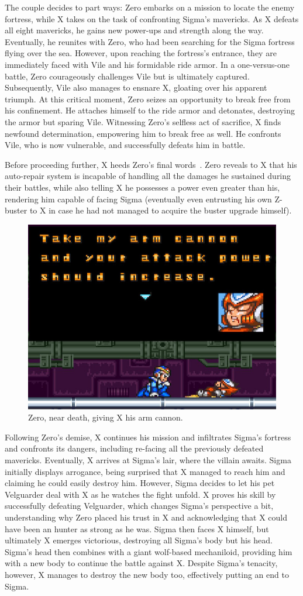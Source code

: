 The couple decides to part ways: Zero embarks on a mission to locate the enemy fortress, while X takes on the task of confronting Sigma's mavericks. As X defeats all eight mavericks, he gains new power-ups and strength along the way. Eventually, he reunites with Zero, who had been searching for the Sigma fortress flying over the sea. However, upon reaching the fortress's entrance, they are immediately faced with Vile and his formidable ride armor. In a one-versus-one battle, Zero courageously challenges Vile but is ultimately captured. Subsequently, Vile also manages to ensnare X, gloating over his apparent triumph. At this critical moment, Zero seizes an opportunity to break free from his confinement. He attaches himself to the ride armor and detonates, destroying the armor but sparing Vile. Witnessing Zero's selfless act of sacrifice, X finds newfound determination, empowering him to break free as well. He confronts Vile, who is now vulnerable, and successfully defeats him in battle.

Before proceeding further, X heeds Zero's final words~\cite{wiki:MMX_script}. Zero reveals to X that his auto-repair system is incapable of handling all the damages he sustained during their battles, while also telling X he possesses a power even greater than his, rendering him capable of facing Sigma (eventually even entrusting his own Z-buster to X in case he had not managed to acquire the buster upgrade himself).

\begin{figure}[htp]
	\centering
	\includegraphics[width=0.5\linewidth]{figures/X1/Zero_cannon.jpg}
	\caption{Zero, near death, giving X his arm cannon.}
\end{figure}

Following Zero's demise, X continues his mission and infiltrates Sigma's fortress and confronts its dangers, including re-facing all the previously defeated mavericks. Eventually, X arrives at Sigma's lair, where the villain awaits. Sigma initially displays arrogance, being surprised that X managed to reach him and claiming he could easily destroy him. However, Sigma decides to let his pet Velguarder deal with X as he watches the fight unfold. X proves his skill by successfully defeating Velguarder, which changes Sigma's perspective a bit, understanding why Zero placed his trust in X and acknowledging that X could have been an hunter as strong as he was. Sigma then faces X himself, but ultimately X emerges victorious, destroying all Sigma's body but his head. Sigma's head then combines with a giant wolf-based mechaniloid, providing him with a new body to continue the battle against X. Despite Sigma's tenacity, however, X manages to destroy the new body too, effectively putting an end to Sigma. 

